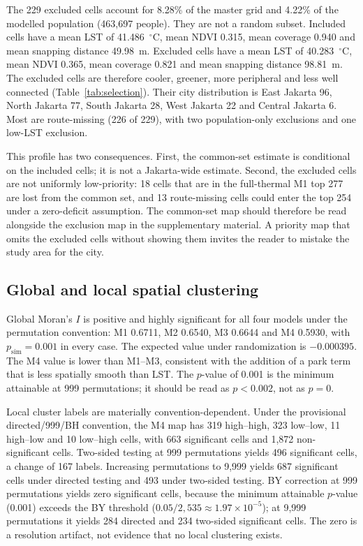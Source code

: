 \documentclass[times,twoside]{_Templates/MultiTargetManuscript}
\begin{document}
The 229 excluded cells account for 8.28\% of the master grid and 4.22\% of the
modelled population (463,697 people). They are not a random subset. Included
cells have a mean LST of 41.486~$^\circ$C, mean NDVI 0.315, mean coverage 0.940
and mean snapping distance 49.98~m. Excluded cells have a mean LST of
40.283~$^\circ$C, mean NDVI 0.365, mean coverage 0.821 and mean snapping distance
98.81~m. The excluded cells are therefore cooler, greener, more peripheral and
less well connected (Table~\ref{tab:selection}). Their city distribution is East Jakarta 96, North Jakarta
77, South Jakarta 28, West Jakarta 22 and Central Jakarta 6. Most are
route-missing (226 of 229), with two population-only exclusions and one low-LST
exclusion.

This profile has two consequences. First, the common-set estimate is conditional
on the included cells; it is not a Jakarta-wide estimate. Second, the excluded
cells are not uniformly low-priority: 18 cells that are in the full-thermal M1
top 277 are lost from the common set, and 13 route-missing cells could enter the
top 254 under a zero-deficit assumption. The common-set map should therefore be
read alongside the exclusion map in the supplementary material. A priority map
that omits the excluded cells without showing them invites the reader to mistake
the study area for the city.



\subsection{Global and local spatial clustering}

Global Moran's $I$ is positive and highly significant for all four models under
the permutation convention: M1 0.6711, M2 0.6540, M3 0.6644 and M4 0.5930, with
$p_{\mathrm{sim}}=0.001$ in every case. The expected value under randomization is
$-0.000395$. The M4 value is lower than M1--M3, consistent with the addition of a
park term that is less spatially smooth than LST. The $p$-value of 0.001 is the
minimum attainable at 999 permutations; it should be read as $p<0.002$, not as
$p=0$.

Local cluster labels are materially convention-dependent. Under the provisional
directed/999/BH convention, the M4 map has 319 high--high, 323 low--low, 11
high--low and 10 low--high cells, with 663 significant cells and 1,872
non-significant cells. Two-sided testing at 999 permutations yields 496
significant cells, a change of 167 labels. Increasing permutations to 9,999
yields 687 significant cells under directed testing and 493 under two-sided
testing. BY correction at 999 permutations yields zero significant cells, because
the minimum attainable $p$-value (0.001) exceeds the BY threshold
($0.05/2{,}535\approx1.97\times10^{-5}$); at 9,999 permutations it yields 284
directed and 234 two-sided significant cells. The zero is a resolution artifact,
not evidence that no local clustering exists.
\end{document}
